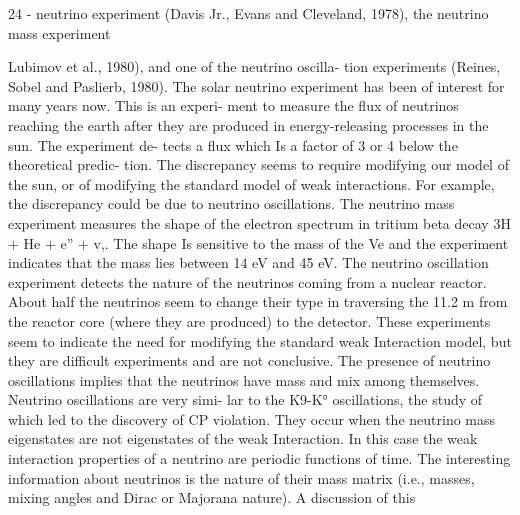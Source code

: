 \documentclass[twoside]{article}
\begin{document}
{{{{{24 -
neutrino experiment (Davis Jr., Evans and Cleveland, 1978), the neutrino
mass experiment {Lubimov et al., 1980), and one of the neutrino oscilla-
tion experiments (Reines, Sobel and Paslierb, 1980). The solar neutrino
experiment has been of interest for many years now. This is an experi-
ment to measure the flux of neutrinos reaching the earth after they are
produced in energy-releasing processes in the sun. The experiment de-
tects a flux which Is a factor of 3 or 4 below the theoretical predic-
tion. The discrepancy seems to require modifying our model of the sun,
or of modifying the standard model of weak interactions. For example,
the discrepancy could be due to neutrino oscillations. The neutrino
mass experiment measures the shape of the electron spectrum in tritium
beta decay 3H + He + e” + v,. The shape Is sensitive to the mass of
the Ve and the experiment indicates that the mass lies between 14 eV
and 45 eV. The neutrino oscillation experiment detects the nature of
the neutrinos coming from a nuclear reactor. About half the neutrinos
seem to change their type in traversing the 11.2 m from the reactor core
(where they are produced) to the detector. These experiments seem to
indicate the need for modifying the standard weak Interaction model,
but they are difficult experiments and are not conclusive.
The presence of neutrino oscillations implies that the neutrinos
have mass and mix among themselves. Neutrino oscillations are very simi-
lar to the K9-K° oscillations, the study of which led to the discovery of
CP violation. They occur when the neutrino mass eigenstates are not
eigenstates of the weak Interaction. In this case the weak interaction
properties of a neutrino are periodic functions of time. The interesting
information about neutrinos is the nature of their mass matrix (i.e.,
masses, mixing angles and Dirac or Majorana nature). A discussion of this

}}}}}}
\end{document}

